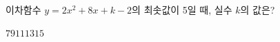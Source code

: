 이차함수 $y=2x^2+8x+k-2$의 최솟값이 5일 때, 실수 $k$의 값은?
\begin{choices32}{$7$}{$9$}{$11$}{$13$}{$15$}\end{choices32}
